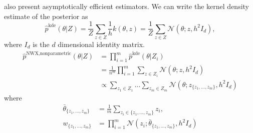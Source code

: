 \documentclass[thesis.tex]{subfiles}
\newcommand{\mse}[1]{}
\newcommand{\eye}[1]{I_{#1}}
\newcommand{\p}[1]{p\left({#1}\right)}
\newcommand{\psup}[2]{\hat p^{#1}({#2})}
\newcommand{\phat}[1]{\psup{}{#1}}
\newcommand{\pkde}[1]{\psup{\text{kde}}{#1}}
\newcommand{\pnp}[1]{\psup{\text{NWX,nonparametric}}{#1}}
\newcommand{\gaussian}[3]{\mathcal N({#1};{#2},{#3})}
\begin{document}
\cite{neiswanger2014asymptotically} also present asymptotically efficient estimators.
We can write the kernel density estimate of the posterior as
\begin{equation}
    \pkde{\theta|Z}
    =
    \frac{1}{Z}\sum_{z\in Z}
    \frac{1}{h}k(\theta,z)
    =
    \frac{1}{Z}\sum_{z\in Z}
    \gaussian{\theta}{z}{h^2 \eye d}
    ,
\end{equation}
where $\eye d$ is the $d$ dimensional identity matrix.
\begin{align}
    \pnp{\theta|Z}
    &=
    \prod_{i=1}^m \pkde{\theta|Z_i}
    \\
    &=
    \frac{1}{n^m}
    \prod_{i=1}^m 
    \sum_{z\in Z_i}
    \gaussian{\theta}{z}{h^2 \eye d}
    \\
    &\propto
    \sum_{z_1\in Z_1}
    \dots
    \sum_{z_m\in Z_m}
    \gaussian{\theta}{z_{\{z_1,...,z_m\}}}{h^2 \eye d}
\end{align}
where
\begin{align}
    \bar\theta_{\{z_1,...,z_m\}} 
    &= 
    \frac{1}{m}\sum_{z_i\in\{z_1,...,z_m\}} z_i
    ,
    \\
    w_{\{z_1,...,z_m\}} 
    &=
    \prod_{i=1}^m\gaussian{z_i}{\bar\theta_{\{z_1,...,z_m\}}}{h^2\eye d}
\end{align}



%
%

\end{document}
